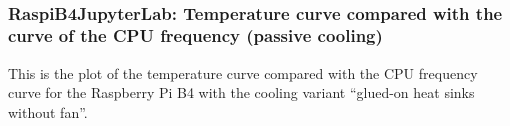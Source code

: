 \documentclass[11pt]{article}
\begin{document}
    \begin{center}
    \end{center}
    { \hspace*{\fill} \\}
    
    \hypertarget{raspib4jupyterlab-temperature-curve-compared-with-the-curve-of-the-cpu-frequency-passive-cooling}{%
\subsubsection{RaspiB4JupyterLab: Temperature curve compared with the
curve of the CPU frequency (passive
cooling)}\label{raspib4jupyterlab-temperature-curve-compared-with-the-curve-of-the-cpu-frequency-passive-cooling}}

This is the plot of the temperature curve compared with the CPU
frequency curve for the Raspberry Pi B4 with the cooling variant
``glued-on heat sinks without fan''.
\end{document}
